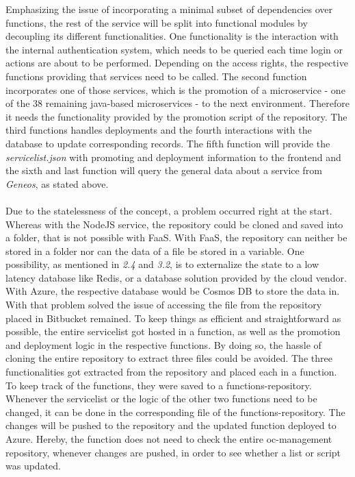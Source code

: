 \documentclass[a4paper,twoside,11pt, pagesize]{scrartcl}
\begin{document}
\begin{spacing}{1.2}
Emphasizing the issue of incorporating a minimal subset of dependencies over functions, the rest of the service will be split into functional modules by decoupling its different functionalities. One functionality is the interaction with the internal authentication system, which needs to be queried each time login or actions are about to be performed. Depending on the access rights, the respective functions providing that services need to be called. The second function incorporates one of those services, which is the promotion of a microservice - one of the 38 remaining java-based microservices - to the next environment. Therefore it needs the functionality provided by the promotion script of the repository. The third functions handles deployments and the fourth interactions with the database to update corresponding records. The fifth function will provide the \textit{servicelist.json} with promoting and deployment information to the frontend and the sixth and last function will query the general data about a service from \textit{Geneos}, as stated above.\\\\Due to the statelessness of the concept, a problem occurred right at the start. Whereas with the NodeJS service, the repository could be cloned and saved into a folder, that is not possible with FaaS. With FaaS, the repository can neither be stored in a folder nor can the data of a file be stored in a variable. One possibility, as mentioned in \textit{2.4} and \textit{3.2}, is to externalize the state to a low latency database like Redis, or a database solution provided by the cloud vendor. With Azure, the respective database would be Cosmos DB to store the data in. With that problem solved the issue of accessing the file from the repository placed in Bitbucket remained. To keep things as efficient and straightforward as possible, the entire servicelist got hosted in a function, as well as the promotion and deployment logic in the respective functions. By doing so, the hassle of cloning the entire repository to extract three files could be avoided. The three functionalities got extracted from the repository and placed each in a function. To keep track of the functions, they were saved to a functions-repository. Whenever the servicelist or the logic of the other two functions need to be changed, it can be done in the corresponding file of the functions-repository. The changes will be pushed to the repository and the updated function deployed to Azure. Hereby, the function does not need to check the entire oc-management repository, whenever changes are pushed, in order to see whether a list or script was updated. 

\end{spacing}
\end{document}
